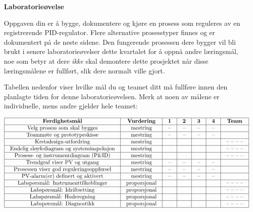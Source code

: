 

\noindent
{\bf Laboratorieøvelse}

\vskip 5pt

Oppgaven din er å bygge, dokumentere og kjøre en prosess som reguleres av en registrerende PID-regulator. Flere alternative prosesstyper finnes og er dokumentert på de neste sidene. Den fungerende prosessen dere bygger vil bli brukt i senere laboratorieøvelser dette kvartalet for å oppnå andre læringsmål, noe som betyr at dere {\it ikke} skal demontere dette prosjektet når disse læringsmålene er fullført, slik dere normalt ville gjort.

Tabellen nedenfor viser hvilke mål du og teamet ditt må fullføre innen den planlagte tiden for denne laboratorieøvelsen. Merk at noen av målene er individuelle, mens andre gjelder hele teamet:



$$\vbox{\offinterlineskip
\halign{\strut
\vrule \quad\hfil # \ \hfil & 
\vrule \quad\hfil # \ \hfil & 
\vrule \quad\hfil # \ \hfil & 
\vrule \quad\hfil # \ \hfil & 
\vrule \quad\hfil # \ \hfil & 
\vrule \quad\hfil # \ \hfil & 
\vrule \quad\hfil # \ \hfil \vrule \cr
\noalign{\hrule}
%
{\bf Ferdighetsmål} & {\bf Vurdering} & {\bf 1} & {\bf 2} & {\bf 3} & {\bf 4} & {\bf Team} \cr
%
\noalign{\hrule}
%
Velg prosess som skal bygges & mestring & -- & -- & -- & -- & \cr
%
\noalign{\hrule}
%
Teammøte og prototypeskisse & mestring & -- & -- & -- & -- & \cr
%
\noalign{\hrule}
%
Kretsdesign-utfordring & mestring & & & & & -- -- -- -- \cr
%
\noalign{\hrule}
%
Endelig sløyfediagram og systeminspeksjon & mestring & & & & & -- -- -- -- \cr
%
\noalign{\hrule}
%
Prosess- og instrumentdiagram (P\&ID) & mestring & & & & & -- -- -- -- \cr
%
\noalign{\hrule}
%
Trendgraf viser PV og utgang & mestring & -- & -- & -- & -- &  \cr
%
\noalign{\hrule}
%
Prosessen viser god reguleringsoppførsel & mestring & -- & -- & -- & -- &  \cr
%
\noalign{\hrule}
%
PV-alarm(er) definert og aktivert & mestring & -- & -- & -- & -- &  \cr
%
\noalign{\hrule}
%
Labspørsmål: Instrumenttilkoblinger & proporsjonal &  &  &  &  & -- -- -- -- \cr
%
\noalign{\hrule}
%
Labspørsmål: Idriftsetting & proporsjonal &  &  &  &  & -- -- -- -- \cr
%
\noalign{\hrule}
%
Labspørsmål: Hoderegning & proporsjonal &  &  &  &  & -- -- -- -- \cr
%
\noalign{\hrule}
%
Labspørsmål: Diagnostikk & proporsjonal &  &  &  &  & -- -- -- -- \cr
%
\noalign{\hrule}
} %
}$$ %

